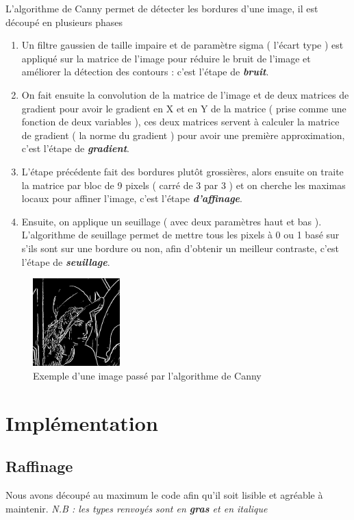 \documentclass[hidelinks,11pt]{article}
\theoremstyle{mytheoremstyle}
\theoremstyle{mytheoremstyle}
\theoremstyle{myproblemstyle}
\begin{document}
    L'algorithme de Canny permet de détecter les bordures d'une image, il est découpé en plusieurs phases
    \begin{enumerate}
        \item Un filtre gaussien de taille impaire et de paramètre sigma ( l’écart type )
         est appliqué sur la matrice de l’image pour réduire le bruit de l’image et améliorer la détection des contours : c’est l’étape de \textbf{\textit{bruit}}.
        \item On fait ensuite la convolution de la matrice de l’image et de deux matrices de gradient pour avoir le gradient en X et en Y de 
        la matrice ( prise comme une fonction de deux variables ), 
        ces deux matrices servent à calculer la matrice de gradient ( la norme du gradient ) 
        pour avoir une première approximation, c’est l’étape de \textit{\textbf{gradient}}.
        \item L’étape précédente fait des bordures plutôt grossières, alors ensuite on traite la matrice par bloc de 9 pixels 
        ( carré de 3 par 3 ) et on cherche les maximas locaux pour affiner l’image, c’est l’étape \textit{\textbf{d’affinage}}.
        \item Ensuite, on applique un seuillage ( avec deux paramètres haut et bas ). 
        L’algorithme de seuillage permet de mettre tous les pixels à 0 ou 1 basé sur s’ils sont sur une bordure ou non,
        afin d’obtenir un meilleur contraste, c’est l’étape de \textit{\textbf{seuillage}}.
    \end{enumerate}
    \begin{figure}[b]
        \centering
        \includegraphics[width=0.3\textwidth]{figs/fig2}
        \caption{Exemple d'une image passé par l'algorithme de Canny}
    \end{figure}

    \section{Implémentation}
    \subsection{Raffinage}
    Nous avons découpé au maximum le code afin qu’il soit lisible et agréable à maintenir. 
    \textit{N.B : les types renvoyés sont en \textbf{gras} et en italique} \newline
\end{document}
